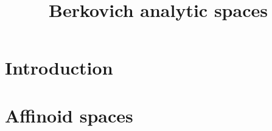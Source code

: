 
\title{Berkovich analytic spaces}

\maketitle
\tableofcontents



\section{Introduction}\label{sec-introduction}

\section{Affinoid spaces}



\cite{stacks-project}

\printbibliography
